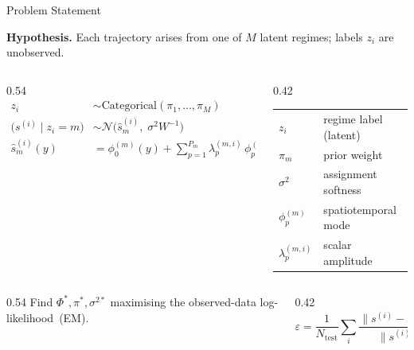 \documentclass[aspectratio=169]{beamer}
\begin{document}
\begin{frame}{Problem Statement}

\textbf{Hypothesis.} Each trajectory arises from one of $M$ latent regimes; labels $z_i$ are unobserved.

\medskip

\begin{columns}[c]
\begin{column}{0.54\textwidth}
  \small
  \begin{align*}
    z_i
      &\sim \mathrm{Categorical}(\pi_1,\ldots,\pi_M) \\[5pt]
    \bigl(s^{(i)} \mid z_i{=}m\bigr)
      &\sim \mathcal{N}\!\bigl(\hat{s}_m^{(i)},\;\sigma^2 W^{-1}\bigr) \\[5pt]
    \hat{s}_m^{(i)}(y)
      &= \phi_0^{(m)}(y)
         + \sum_{p=1}^{P_m}\lambda_p^{(m,i)}\,\phi_p^{(m)}(y)
  \end{align*}
\end{column}
\begin{column}{0.42\textwidth}
  \small\renewcommand{\arraystretch}{1.5}
  \begin{tabular}{ll}
    $z_i$               & regime label (latent)  \\
    $\pi_m$             & prior weight           \\
    $\sigma^2$          & assignment softness    \\
    $\phi_p^{(m)}$      & spatiotemporal mode    \\
    $\lambda_p^{(m,i)}$ & scalar amplitude       \\
  \end{tabular}
\end{column}
\end{columns}

\medskip

\begin{columns}[c]
\begin{column}{0.54\textwidth}
  \small Find $\Phi^*,\pi^*,\sigma^{2*}$
  maximising the observed-data log-likelihood~(EM).
\end{column}
\begin{column}{0.42\textwidth}
  \[
    \varepsilon = \frac{1}{N_{\mathrm{test}}}
    \sum_{i}\frac{\|s^{(i)}-\hat{s}^{(i)}\|}{\|s^{(i)}\|}
  \]
\end{column}
\end{columns}

\end{frame}
\end{document}
